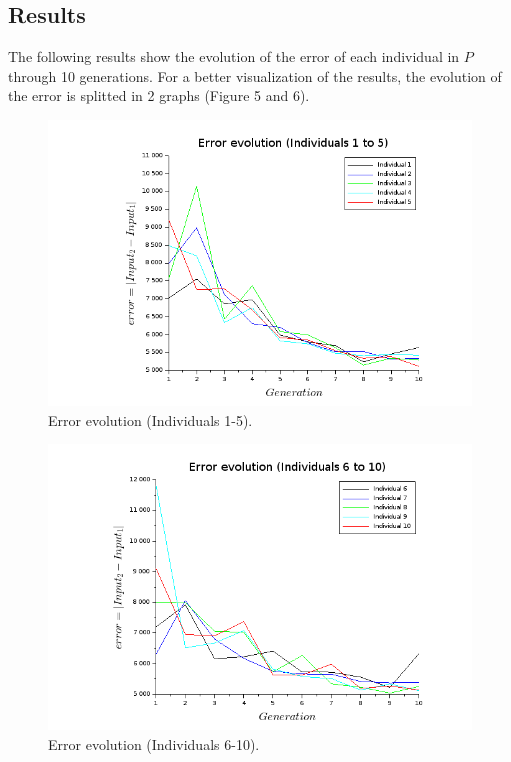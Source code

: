 \documentclass{sig-alternate-05-2015}
\begin{document}
\bigskip
\bigskip

\subsection{Results}

The following results show the evolution of the error of each individual in $P$ through 10 generations. For a better visualization of the results, the evolution of the error is splitted in 2 graphs (Figure 5 and 6).

\begin{figure}[h!]
\centering
\includegraphics [scale=0.32]{errev1}
\caption{Error evolution (Individuals 1-5).}
\end{figure}

\begin{figure}[h!]
\centering
\includegraphics [scale=0.32]{errev2}
\caption{Error evolution (Individuals 6-10).}
\end{figure}
\end{document}
